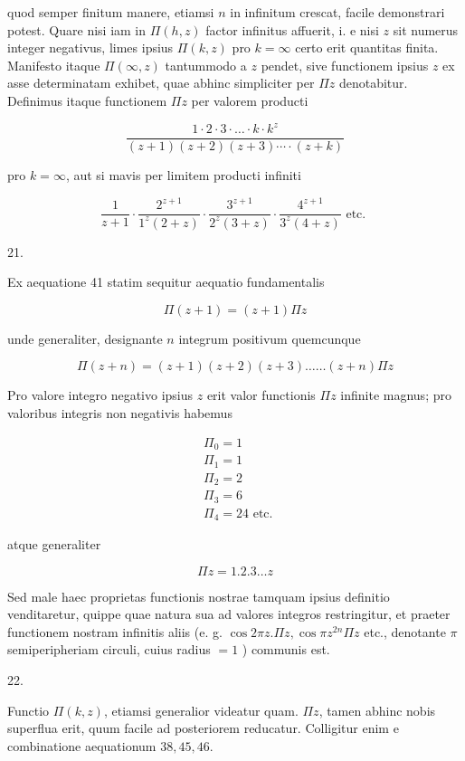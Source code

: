 \documentclass[10pt]{article}
\begin{document}
quod semper finitum manere, etiamsi \(n\) in infinitum crescat, facile demonstrari potest. Quare nisi iam in \(\Pi(h, z)\) factor infinitus affuerit, i. e nisi \(z\) sit numerus integer negativus, limes ipsius \(\Pi(k, z)\) pro \(k=\infty\) certo erit quantitas finita. Manifesto itaque \(\Pi(\infty, z)\) tantummodo a \(z\) pendet, sive functionem ipsius \(z\) ex asse determinatam exhibet, quae abhinc simpliciter per \(\Pi z\) denotabitur. Definimus itaque functionem \(\Pi z\) per valorem producti

\[
\frac{1 \cdot 2 \cdot 3 \cdot \ldots \cdot k \cdot k^{z}}{(z+1)(z+2)(z+3) \cdots \cdot(z+k)}
\]

pro \(k=\infty\), aut si mavis per limitem producti infiniti

\[
\frac{1}{z+1} \cdot \frac{2^{z+1}}{1^{z}(2+z)} \cdot \frac{3^{z+1}}{2^{z}(3+z)} \cdot \frac{4^{z+1}}{3^{z}(4+z)} \text { etc. }
\]

21.

Ex aequatione 41 statim sequitur aequatio fundamentalis

\[
\Pi(z+1)=(z+1) \Pi z
\]

unde generaliter, designante \(n\) integrum positivum quemcunque

\[
\Pi(z+n)=(z+1)(z+2)(z+3) \ldots \ldots(z+n) \Pi z
\]

Pro valore integro negativo ipsius \(z\) erit valor functionis \(\Pi z\) infinite magnus; pro valoribus integris non negativis habemus

\[
\begin{aligned}
& \Pi_{0}=1 \\
& \Pi_{1}=1 \\
& \Pi_{2}=2 \\
& \Pi_{3}=6 \\
& \Pi_{4}=24 \text { etc. }
\end{aligned}
\]

atque generaliter

\[
\Pi z=1.2 .3 \ldots z
\]

Sed male haec proprietas functionis nostrae tamquam ipsius definitio venditaretur, quippe quae natura sua ad valores integros restringitur, et praeter functionem nostram infinitis aliis (e. g. \(\cos 2 \pi z . \Pi z, \cos \pi z^{2 n} \Pi z\) etc., denotante \(\pi\) semiperipheriam circuli, cuius radius \(=1\) ) communis est.

22.

Functio \(\Pi(k, z)\), etiamsi generalior videatur quam. \(\Pi z\), tamen abhinc nobis superflua erit, quum facile ad posteriorem reducatur. Colligitur enim e combinatione aequationum \(38,45,46\).
\end{document}
